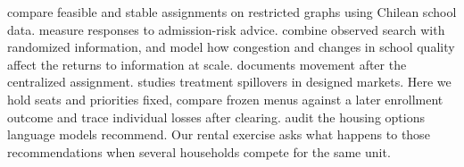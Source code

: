 \documentclass[format=acmsmall,review=false]{acmart}
\begin{document}
\citet{aguiarhong2026} compare feasible and stable assignments on restricted graphs using Chilean school data. \citet{smartplatforms} measure responses to admission-risk advice. \citet{schoolSearch} combine observed search with randomized information, and \citet{informedEquilibrium} model how congestion and changes in school quality affect the returns to information at scale. \citet{saeDecade} documents movement after the centralized assignment. \citet{munrointerference} studies treatment spillovers in designed markets. Here we hold seats and priorities fixed, compare frozen menus against a later enrollment outcome and trace individual losses after clearing. \citet{liu2024housing} audit the housing options language models recommend. Our rental exercise asks what happens to those recommendations when several households compete for the same unit.















\clearpage
\appendix




















\end{document}
